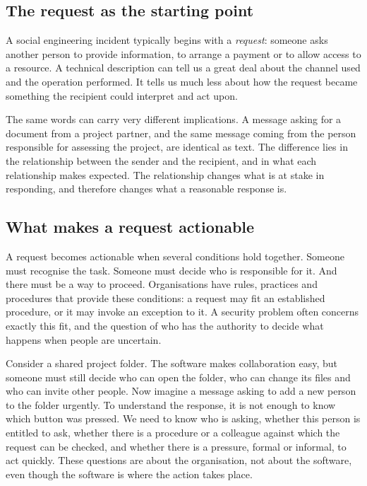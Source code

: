 \subsection{The request as the starting point}
A social engineering incident typically begins with a \emph{request}: someone asks another person to provide information, to arrange a payment or to allow access to a resource. A technical description can tell us a great deal about the channel used and the operation performed. It tells us much less about how the request became something the recipient could interpret and act upon.

The same words can carry very different implications. A message asking for a document from a project partner, and the same message coming from the person responsible for assessing the project, are identical as text. The difference lies in the relationship between the sender and the recipient, and in what each relationship makes expected. The relationship changes what is at stake in responding, and therefore changes what a reasonable response is.

\subsection{What makes a request actionable}
A request becomes actionable when several conditions hold together. Someone must recognise the task. Someone must decide who is responsible for it. And there must be a way to proceed. Organisations have rules, practices and procedures that provide these conditions: a request may fit an established procedure, or it may invoke an exception to it. A security problem often concerns exactly this fit, and the question of who has the authority to decide what happens when people are uncertain.

Consider a shared project folder. The software makes collaboration easy, but someone must still decide who can open the folder, who can change its files and who can invite other people. Now imagine a message asking to add a new person to the folder urgently. To understand the response, it is not enough to know which button was pressed. We need to know who is asking, whether this person is entitled to ask, whether there is a procedure or a colleague against which the request can be checked, and whether there is a pressure, formal or informal, to act quickly. These questions are about the organisation, not about the software, even though the software is where the action takes place.

